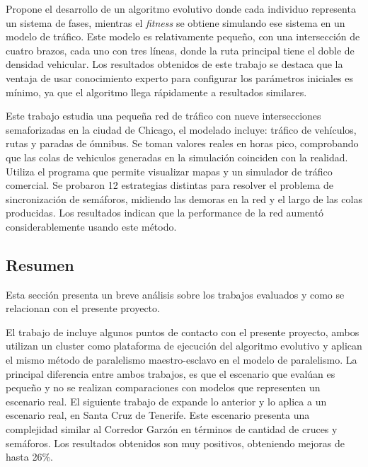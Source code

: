 \begin{itemize}
\begin{item}
 Propone el desarrollo de un algoritmo evolutivo donde cada individuo representa un sistema de fases, mientras el \emph{fitness} se obtiene simulando ese sistema en un modelo de tráfico. Este modelo es relativamente pequeño, con una intersección de cuatro brazos, cada uno con tres líneas, donde la ruta principal tiene el doble de densidad vehicular. Los resultados obtenidos de este trabajo se destaca que la ventaja de usar conocimiento experto para configurar los parámetros iniciales es mínimo, ya que el algoritmo llega rápidamente a resultados similares. 

\end{item}	

\begin{item}

Este trabajo estudia una pequeña red de tráfico con nueve intersecciones semaforizadas en la ciudad de Chicago, el modelado incluye: tráfico de vehículos, rutas y paradas de ómnibus.  Se toman valores reales en horas pico, comprobando que las colas de vehiculos generadas en la simulación coinciden con la realidad. Utiliza el programa \citet{TRANSYT-7F} que permite visualizar mapas y \citet{CORSIM} un simulador de tráfico comercial.
Se probaron 12 estrategias distintas para resolver el problema de sincronización de semáforos, midiendo las demoras en la red y el largo de las colas producidas. Los resultados indican que la performance de la red aumentó considerablemente usando este método.	
\end{item}	
	
\end{itemize}


\subsection{Resumen}
Esta sección presenta un breve análisis sobre los trabajos evaluados y como se relacionan con el presente proyecto.

El trabajo de \citet{Sanchez2004} incluye algunos puntos de contacto con el presente proyecto, ambos utilizan un cluster como plataforma de ejecución del algoritmo evolutivo y aplican el mismo método de paralelismo maestro-esclavo en el modelo de paralelismo. La principal diferencia entre ambos trabajos, es que el escenario que evalúan es pequeño y no se realizan comparaciones con modelos que representen un escenario real. El siguiente trabajo de \citet{Sanchez2008} expande lo anterior y lo aplica a un escenario real, en Santa Cruz de Tenerife. Este escenario presenta una complejidad similar al Corredor Garzón en términos de cantidad de cruces y semáforos. Los resultados obtenidos son muy positivos, obteniendo mejoras de hasta 26\%.

